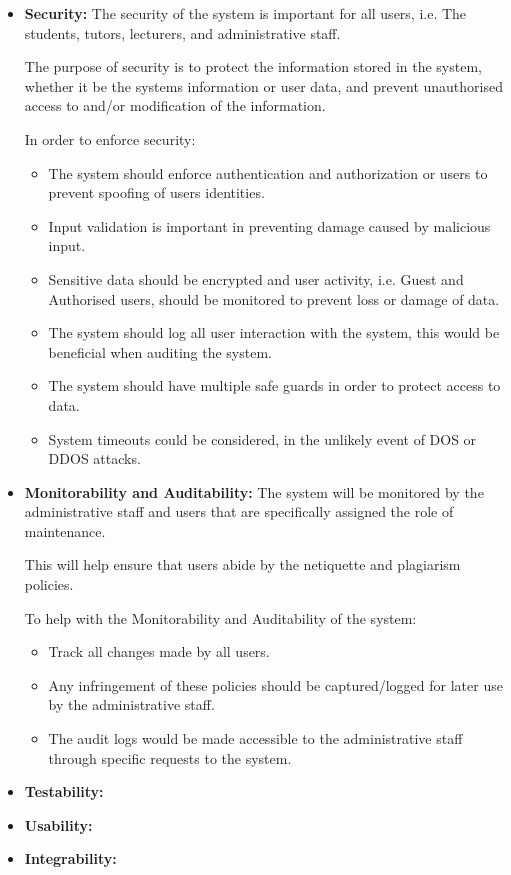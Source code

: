 \begin{flushleft}
\begin{itemize}
	
		
		\item \textbf{Security:} 
The security of the system is important for all users, i.e. The students, tutors, lecturers, and administrative staff.
\newline

The purpose of security is to protect the information stored in the system, whether it be the systems information or user data, and prevent unauthorised access to and/or modification of the information.
\newline

In order to enforce security:
\begin{itemize}
 \item The system should enforce authentication and authorization or users to prevent spoofing of users identities.
 \item Input validation is important in preventing damage caused by malicious input.
 \item Sensitive data should be encrypted and user activity, i.e. Guest and Authorised users, should be monitored to prevent loss or damage of data.
 \item The system should log all user interaction with the system, this would be beneficial when auditing the system.
 \item The system should have multiple safe guards in order to protect access to data.
 \item System timeouts could be considered, in the unlikely event of DOS or DDOS attacks.
\end{itemize}
 
		\item \textbf{Monitorability and Auditability:} 
The system will be monitored by the administrative staff and users that are specifically assigned the role of maintenance. \newline

This will help ensure that users abide by the netiquette and plagiarism policies.  \newline

To help with the Monitorability and Auditability of the system:
\begin{itemize}
\item Track all changes made by all users. 
\item Any infringement of these policies should be captured/logged for later use by the administrative staff.
\item The audit logs would be made accessible to the administrative staff through specific requests to the system. 
\end{itemize}


			
		\item \textbf{Testability:} 
		\item \textbf{Usability:} 
		\item \textbf{Integrability:} 
	\end{itemize}
	
\end{flushleft}

